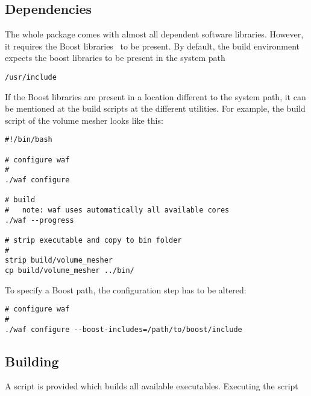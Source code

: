 \subsection{Dependencies}
The whole package comes with almost all dependent software libraries.
However, it requires the Boost libraries~\cite{boost} to be present.
By default, the build environment expects the boost libraries to be present 
in the system path
\begin{exaipd}
\begin{Verbatim}
/usr/include
\end{Verbatim}
\end{exaipd}

If the Boost libraries are present in a location different to the system 
path, it can be mentioned at the build scripts at the different 
utilities. For example, the build script of the volume mesher looks like this:

\begin{exaipd}
\begin{Verbatim}
#!/bin/bash

# configure waf
#
./waf configure 

# build
#   note: waf uses automatically all available cores
./waf --progress

# strip executable and copy to bin folder
#
strip build/volume_mesher
cp build/volume_mesher ../bin/
\end{Verbatim}
\end{exaipd}

To specify a Boost path, the configuration step has to be altered:

\begin{exaipd}
\begin{Verbatim}
# configure waf
#
./waf configure --boost-includes=/path/to/boost/include
\end{Verbatim}
\end{exaipd}


\subsection{Building}
A script is provided which builds all available executables.
Executing the script 

